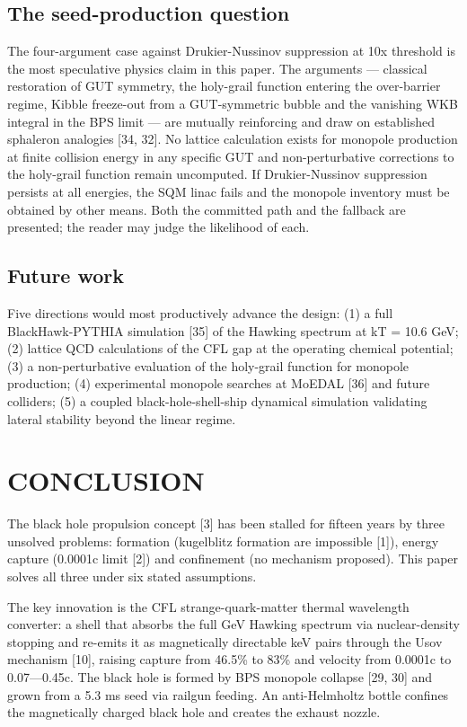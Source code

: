\documentclass[12pt,a4paper]{article}
\begin{document}
\subsection{The seed-production question}
The four-argument case against Drukier-Nussinov suppression at 10x threshold is the most speculative physics claim in this paper. The arguments --- classical restoration of GUT symmetry, the holy-grail function entering the over-barrier regime, Kibble freeze-out from a GUT-symmetric bubble and the vanishing WKB integral in the BPS limit --- are mutually reinforcing and draw on established sphaleron analogies [34, 32]. No lattice calculation exists for monopole production at finite collision energy in any specific GUT and non-perturbative corrections to the holy-grail function remain uncomputed. If Drukier-Nussinov suppression persists at all energies, the SQM linac fails and the monopole inventory must be obtained by other means. Both the committed path and the fallback are presented; the reader may judge the likelihood of each.

\subsection{Future work}
Five directions would most productively advance the design: (1) a full BlackHawk-PYTHIA simulation [35] of the Hawking spectrum at kT = 10.6 GeV; (2) lattice QCD calculations of the CFL gap at the operating chemical potential; (3) a non-perturbative evaluation of the holy-grail function for monopole production; (4) experimental monopole searches at MoEDAL [36] and future colliders; (5) a coupled black-hole-shell-ship dynamical simulation validating lateral stability beyond the linear regime.

\section{CONCLUSION}
The black hole propulsion concept [3] has been stalled for fifteen years by three unsolved problems: formation (kugelblitz formation are impossible [1]), energy capture (0.0001c limit [2]) and confinement (no mechanism proposed). This paper solves all three under six stated assumptions.

The key innovation is the CFL strange-quark-matter thermal wavelength converter: a shell that absorbs the full GeV Hawking spectrum via nuclear-density stopping and re-emits it as magnetically directable keV pairs through the Usov mechanism [10], raising capture from 46.5\% to 83\% and velocity from 0.0001c to 0.07---0.45c. The black hole is formed by BPS monopole collapse [29, 30] and grown from a 5.3 ms seed via railgun feeding. An anti-Helmholtz bottle confines the magnetically charged black hole and creates the exhaust nozzle.
\end{document}
